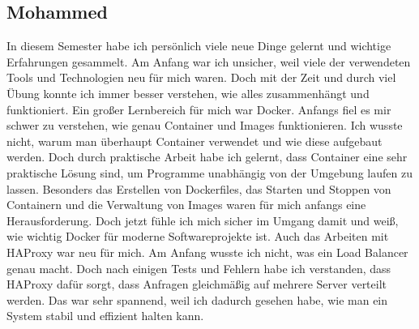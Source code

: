 \subsection{Mohammed}
In diesem Semester habe ich persönlich viele neue Dinge gelernt und wichtige Erfahrungen gesammelt. Am Anfang war ich unsicher, weil viele der verwendeten Tools und Technologien neu für mich waren. Doch mit der Zeit und durch viel Übung konnte ich immer besser verstehen, wie alles zusammenhängt und funktioniert. Ein großer Lernbereich für mich war Docker. Anfangs fiel es mir schwer zu verstehen, wie genau Container und Images funktionieren. Ich wusste nicht, warum man überhaupt Container verwendet und wie diese aufgebaut werden. Doch durch praktische Arbeit habe ich gelernt, dass Container eine sehr praktische Lösung sind, um Programme unabhängig von der Umgebung laufen zu lassen. Besonders das Erstellen von Dockerfiles, das Starten und Stoppen von Containern und die Verwaltung von Images waren für mich anfangs eine Herausforderung. Doch jetzt fühle ich mich sicher im Umgang damit und weiß, wie wichtig Docker für moderne Softwareprojekte ist. Auch das Arbeiten mit HAProxy war neu für mich. Am Anfang wusste ich nicht, was ein Load Balancer genau macht. Doch nach einigen Tests und Fehlern habe ich verstanden, dass HAProxy dafür sorgt, dass Anfragen gleichmäßig auf mehrere Server verteilt werden. Das war sehr spannend, weil ich dadurch gesehen habe, wie man ein System stabil und effizient halten kann.

